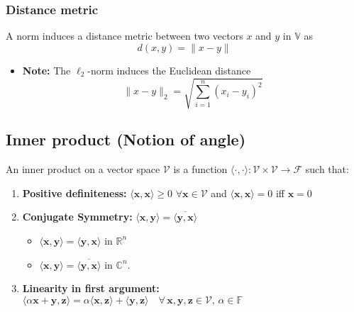     \subsubsection{Distance metric}
    \begin{definition}
        A norm induces a distance metric between two vectors $x$ and $y$ in $\mathbb{V}$ as
        \[
        d(x, y) = \|x - y\|
        \]

        \begin{itemize}
            \item \textbf{Note:} The $\ell_2$-norm induces the Euclidean distance
            \[
            \|x - y\|_2 = \sqrt{\sum_{i=1}^{n} (x_i - y_i)^2}
            \]
        \end{itemize}
    \end{definition}

\subsection{Inner product (Notion of angle)}
\begin{definition}
    An inner product on a vector space $\mathcal{V}$ is a function $\langle \cdot, \cdot \rangle : \mathcal{V} \times \mathcal{V} \to \mathcal{F}$ such that:

    \begin{enumerate}
        \item \textbf{Positive definiteness:} \( \langle \mathbf{x}, \mathbf{x} \rangle \geq 0 \) $\forall \mathbf{x} \in \mathcal{V}$ and \( \langle \mathbf{x}, \mathbf{x} \rangle = 0 \) iff \( \mathbf{x} = 0 \)
        \item \textbf{Conjugate Symmetry:} \( \langle \mathbf{x}, \mathbf{y} \rangle = \overline{\langle \mathbf{y}, \mathbf{x} \rangle} \) 
        \begin{itemize}
            \item \( \langle \mathbf{x}, \mathbf{y} \rangle = \langle \mathbf{y}, \mathbf{x} \rangle \) in $\mathbb{R}^n$ 
            \item \( \langle \mathbf{x}, \mathbf{y} \rangle = \overline{\langle \mathbf{y}, \mathbf{x} \rangle} \) in \( \mathbb{C}^n \).
        \end{itemize}
        \item \textbf{Linearity in first argument:} $\langle \alpha \mathbf{x} + \mathbf{y}, \mathbf{z} \rangle = \alpha \langle \mathbf{x}, \mathbf{z} \rangle + \langle \mathbf{y}, \mathbf{z} \rangle \quad \forall \, \mathbf{x}, \mathbf{y}, \mathbf{z} \in \mathcal{V}, \, \alpha \in \mathbb{F}$
    \end{enumerate}
\end{definition}

